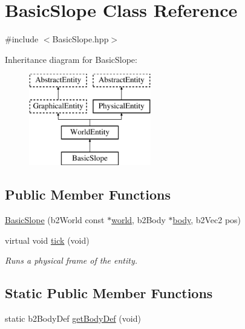 \hypertarget{class_basic_slope}{}\section{Basic\+Slope Class Reference}
\label{class_basic_slope}


{\ttfamily \#include $<$Basic\+Slope.\+hpp$>$}

Inheritance diagram for Basic\+Slope\+:\begin{figure}[H]
\begin{center}
\leavevmode
\includegraphics[height=4.000000cm]{class_basic_slope}
\end{center}
\end{figure}
\subsection*{Public Member Functions}
\begin{DoxyCompactItemize}
\item 
\hyperlink{class_basic_slope_afc0a882dcf1f2b03236640c635cfbc46}{Basic\+Slope} (b2\+World const $\ast$\hyperlink{class_physical_entity_ae6c23c3817c4d7f9a867abed05cd7834}{world}, b2\+Body $\ast$\hyperlink{class_physical_entity_a91a5016393dd890c490b329abd938ec7}{body}, b2\+Vec2 pos)
\item 
virtual void \hyperlink{class_basic_slope_a61be54e264d4dba781efa7d611634aed}{tick} (void)
\begin{DoxyCompactList}\small\item\em Runs a physical frame of the entity. \end{DoxyCompactList}\end{DoxyCompactItemize}
\subsection*{Static Public Member Functions}
\begin{DoxyCompactItemize}
\item 
static b2\+Body\+Def \hyperlink{class_basic_slope_a93df874251550b91c9f0ff759c49afdb}{get\+Body\+Def} (void)
\end{DoxyCompactItemize}
